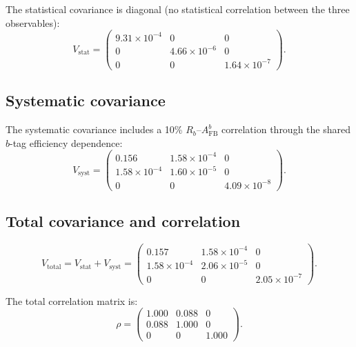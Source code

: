 \documentclass[11pt,a4paper]{article}
\begin{document}
The statistical covariance is diagonal (no statistical correlation between the three
observables):
\begin{equation}
V_\mathrm{stat} = \begin{pmatrix}
9.31 \times 10^{-4} & 0 & 0 \\
0 & 4.66 \times 10^{-6} & 0 \\
0 & 0 & 1.64 \times 10^{-7}
\end{pmatrix}.
\label{eq:stat_cov}
\end{equation}

\subsection{Systematic covariance}

The systematic covariance includes a 10\% $R_b$--$A_\mathrm{FB}^b$ correlation through
the shared $b$-tag efficiency dependence:
\begin{equation}
V_\mathrm{syst} = \begin{pmatrix}
0.156 & 1.58 \times 10^{-4} & 0 \\
1.58 \times 10^{-4} & 1.60 \times 10^{-5} & 0 \\
0 & 0 & 4.09 \times 10^{-8}
\end{pmatrix}.
\label{eq:syst_cov}
\end{equation}

\subsection{Total covariance and correlation}

\begin{equation}
V_\mathrm{total} = V_\mathrm{stat} + V_\mathrm{syst} = \begin{pmatrix}
0.157 & 1.58 \times 10^{-4} & 0 \\
1.58 \times 10^{-4} & 2.06 \times 10^{-5} & 0 \\
0 & 0 & 2.05 \times 10^{-7}
\end{pmatrix}.
\label{eq:total_cov}
\end{equation}

The total correlation matrix is:
\begin{equation}
\rho = \begin{pmatrix}
1.000 & 0.088 & 0 \\
0.088 & 1.000 & 0 \\
0 & 0 & 1.000
\end{pmatrix}.
\label{eq:correlation}
\end{equation}
\end{document}
